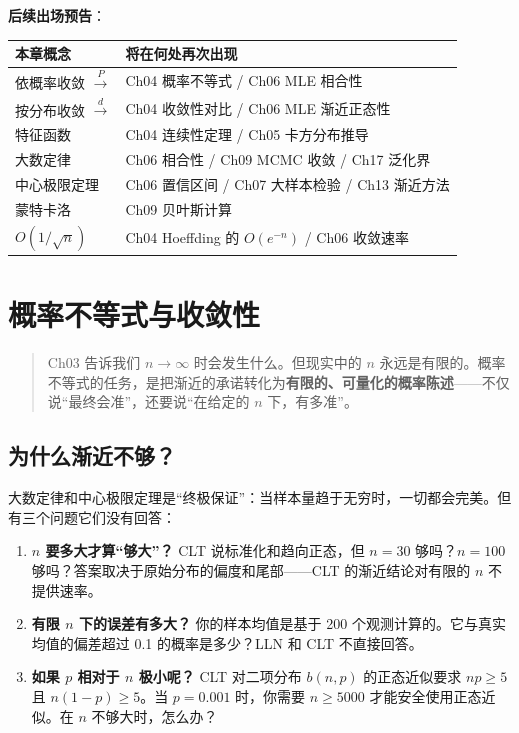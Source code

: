 \documentclass[
]{book}
\providecommand{\tightlist}{%
  \setlength{\itemsep}{0pt}\setlength{\parskip}{0pt}}
\begin{document}
\textbf{后续出场预告}：

\begin{longtable}[]{@{}ll@{}}
\toprule\noalign{}
本章概念 & 将在何处再次出现 \\
\midrule\noalign{}
\endhead
\bottomrule\noalign{}
\endlastfoot
依概率收敛 \(\xrightarrow{P}\) & Ch04 概率不等式 / Ch06 MLE 相合性 \\
按分布收敛 \(\xrightarrow{d}\) & Ch04 收敛性对比 / Ch06 MLE 渐近正态性 \\
特征函数 & Ch04 连续性定理 / Ch05 卡方分布推导 \\
大数定律 & Ch06 相合性 / Ch09 MCMC 收敛 / Ch17 泛化界 \\
中心极限定理 & Ch06 置信区间 / Ch07 大样本检验 / Ch13 渐近方法 \\
蒙特卡洛 & Ch09 贝叶斯计算 \\
\(O(1/\sqrt{n})\) & Ch04 Hoeffding 的 \(O(e^{-n})\) / Ch06 收敛速率 \\
\end{longtable}

\chapter{概率不等式与收敛性}\label{ux6982ux7387ux4e0dux7b49ux5f0fux4e0eux6536ux655bux6027}

\begin{quote}
Ch03 告诉我们 \(n \to \infty\) 时会发生什么。但现实中的 \(n\) 永远是有限的。概率不等式的任务，是把渐近的承诺转化为\textbf{有限的、可量化的概率陈述}------不仅说``最终会准''，还要说``在给定的 \(n\) 下，有多准''。
\end{quote}

\section{为什么渐近不够？}\label{ux4e3aux4ec0ux4e48ux6e10ux8fd1ux4e0dux591f}

大数定律和中心极限定理是``终极保证''：当样本量趋于无穷时，一切都会完美。但有三个问题它们没有回答：

\begin{enumerate}
\def\labelenumi{\arabic{enumi}.}
\tightlist
\item
  \textbf{\(n\) 要多大才算``够大''？} CLT 说标准化和趋向正态，但 \(n=30\) 够吗？\(n=100\) 够吗？答案取决于原始分布的偏度和尾部------CLT 的渐近结论对有限的 \(n\) 不提供速率。
\item
  \textbf{有限 \(n\) 下的误差有多大？} 你的样本均值是基于 200 个观测计算的。它与真实均值的偏差超过 0.1 的概率是多少？LLN 和 CLT 不直接回答。
\item
  \textbf{如果 \(p\) 相对于 \(n\) 极小呢？} CLT 对二项分布 \(b(n,p)\) 的正态近似要求 \(np \geq 5\) 且 \(n(1-p) \geq 5\)。当 \(p = 0.001\) 时，你需要 \(n \geq 5000\) 才能安全使用正态近似。在 \(n\) 不够大时，怎么办？
\end{enumerate}
\end{document}
